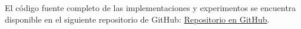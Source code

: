 El código fuente completo de las implementaciones y experimentos se encuentra disponible en el siguiente repositorio de GitHub: \href{[https://github.com/ENZ1000/Tarea-1-INF221](https://github.com/ENZ1000/Tarea-1-INF221)}{Repositorio en GitHub}.